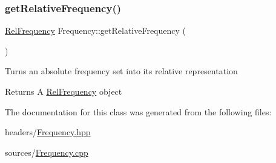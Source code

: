 \subsubsection{\texorpdfstring{get\+Relative\+Frequency()}{getRelativeFrequency()}}
{\footnotesize\ttfamily \hyperlink{classRelFrequency}{Rel\+Frequency} Frequency\+::get\+Relative\+Frequency (\begin{DoxyParamCaption}{ }\end{DoxyParamCaption})}

Turns an absolute frequency set into it\textquotesingle{}s relative representation

\begin{DoxyReturn}{Returns}
A \hyperlink{classRelFrequency}{Rel\+Frequency} object 
\end{DoxyReturn}


The documentation for this class was generated from the following files\+:\begin{DoxyCompactItemize}
\item 
headers/\hyperlink{Frequency_8hpp}{Frequency.\+hpp}\item 
sources/\hyperlink{Frequency_8cpp}{Frequency.\+cpp}\end{DoxyCompactItemize}
